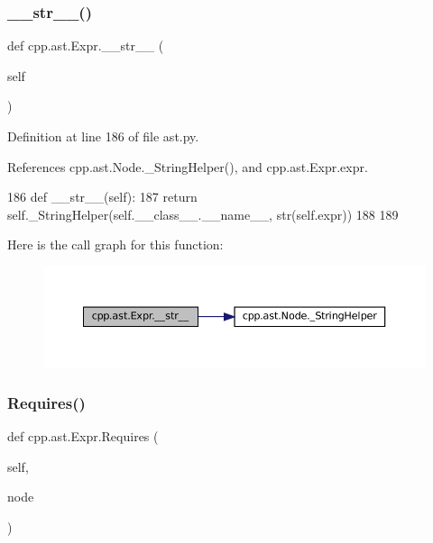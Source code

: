 \subsubsection{\texorpdfstring{\+\_\+\+\_\+str\+\_\+\+\_\+()}{\_\_str\_\_()}}
{\footnotesize\ttfamily def cpp.\+ast.\+Expr.\+\_\+\+\_\+str\+\_\+\+\_\+ (\begin{DoxyParamCaption}\item[{}]{self }\end{DoxyParamCaption})}



Definition at line 186 of file ast.\+py.



References cpp.\+ast.\+Node.\+\_\+\+String\+Helper(), and cpp.\+ast.\+Expr.\+expr.


\begin{DoxyCode}
186     \textcolor{keyword}{def }\_\_str\_\_(self):
187         \textcolor{keywordflow}{return} self.\_StringHelper(self.\_\_class\_\_.\_\_name\_\_, str(self.expr))
188 
189 
\end{DoxyCode}
Here is the call graph for this function\+:
\nopagebreak
\begin{figure}[H]
\begin{center}
\leavevmode
\includegraphics[width=350pt]{classcpp_1_1ast_1_1Expr_a7ee1896fbfa7819adbd0b2f89d11ecec_cgraph}
\end{center}
\end{figure}
\mbox{\label{classcpp_1_1ast_1_1Expr_a9c92416eb1285068f190dcda8fd33682}} 
\subsubsection{\texorpdfstring{Requires()}{Requires()}}
{\footnotesize\ttfamily def cpp.\+ast.\+Expr.\+Requires (\begin{DoxyParamCaption}\item[{}]{self,  }\item[{}]{node }\end{DoxyParamCaption})}




